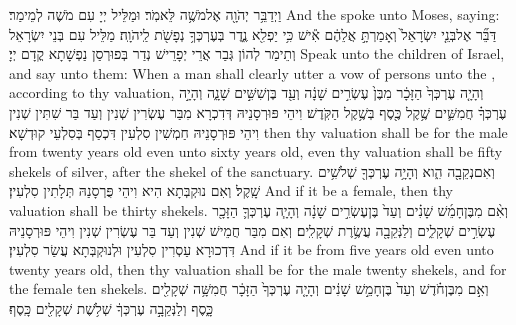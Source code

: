 {וַיְדַבֵּ֥ר יְהֹוָ֖ה אֶל\maqqaf מֹשֶׁ֥ה לֵּאמֹֽר׃}
{וּמַלֵּיל יְיָ עִם מֹשֶׁה לְמֵימַר׃}
{And the \lord\space spoke unto Moses, saying:}{}
{דַּבֵּ֞ר אֶל\maqqaf בְּנֵ֤י יִשְׂרָאֵל֙ וְאָמַרְתָּ֣ אֲלֵהֶ֔ם אִ֕ישׁ כִּ֥י יַפְלִ֖א נֶ֑דֶר בְּעֶרְכְּךָ֥ נְפָשֹׁ֖ת לַֽיהֹוָֽה׃}
{מַלֵּיל עִם בְּנֵי יִשְׂרָאֵל וְתֵימַר לְהוֹן גְּבַר אֲרֵי יְפָרֵישׁ נְדַר בְּפוּרְסַן נַפְשָׁתָא קֳדָם יְיָ׃}
{Speak unto the children of Israel, and say unto them: When a man shall clearly utter a vow of persons unto the \lord, according to thy valuation,}{}
{וְהָיָ֤ה עֶרְכְּךָ֙ הַזָּכָ֔ר מִבֶּן֙ עֶשְׂרִ֣ים שָׁנָ֔ה וְעַ֖ד בֶּן\maqqaf שִׁשִּׁ֣ים שָׁנָ֑ה וְהָיָ֣ה עֶרְכְּךָ֗ חֲמִשִּׁ֛ים שֶׁ֥קֶל כֶּ֖סֶף בְּשֶׁ֥קֶל הַקֹּֽדֶשׁ׃}
{וִיהֵי פּוּרְסָנֵיהּ דְּדִכְרָא מִבַּר עֶשְׂרִין שְׁנִין וְעַד בַּר שִׁתִּין שְׁנִין וִיהֵי פּוּרְסָנֵיהּ חַמְשִׁין סִלְעִין דִּכְסַף בְּסִלְעֵי קוּדְשָׁא׃}
{then thy valuation shall be for the male from twenty years old even unto sixty years old, even thy valuation shall be fifty shekels of silver, after the shekel of the sanctuary.}{}
{וְאִם\maqqaf נְקֵבָ֖ה הִ֑וא וְהָיָ֥ה עֶרְכְּךָ֖ שְׁלֹשִׁ֥ים שָֽׁקֶל׃}
{וְאִם נוּקְבְּתָא הִיא וִיהֵי פֻּרְסָנַהּ תְּלָתִין סִלְעִין׃}
{And if it be a female, then thy valuation shall be thirty shekels.}{}
{וְאִ֨ם מִבֶּן\maqqaf חָמֵ֜שׁ שָׁנִ֗ים וְעַד֙ בֶּן\maqqaf עֶשְׂרִ֣ים שָׁנָ֔ה וְהָיָ֧ה עֶרְכְּךָ֛ הַזָּכָ֖ר עֶשְׂרִ֣ים שְׁקָלִ֑ים וְלַנְּקֵבָ֖ה עֲשֶׂ֥רֶת שְׁקָלִֽים׃}
{וְאִם מִבַּר חֲמֵישׁ שְׁנִין וְעַד בַּר עֶשְׂרִין שְׁנִין וִיהֵי פּוּרְסָנֵיהּ דִּדְכוּרָא עַסְרִין סִלְעִין וּלְנוּקְבְּתָא עֲשַׂר סִלְעִין׃}
{And if it be from five years old even unto twenty years old, then thy valuation shall be for the male twenty shekels, and for the female ten shekels.}{}
{וְאִ֣ם מִבֶּן\maqqaf חֹ֗דֶשׁ וְעַד֙ בֶּן\maqqaf חָמֵ֣שׁ שָׁנִ֔ים וְהָיָ֤ה עֶרְכְּךָ֙ הַזָּכָ֔ר חֲמִשָּׁ֥ה שְׁקָלִ֖ים כָּ֑סֶף וְלַנְּקֵבָ֣ה עֶרְכְּךָ֔ שְׁלֹ֥שֶׁת שְׁקָלִ֖ים כָּֽסֶף׃}
